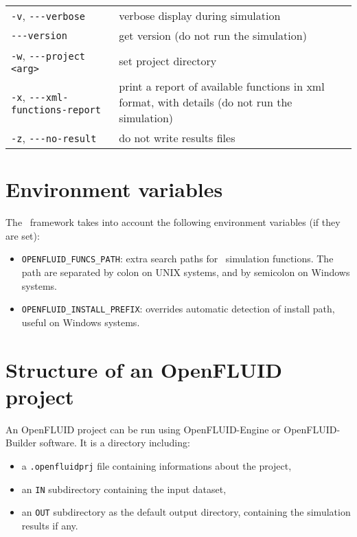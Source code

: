 \begin{center}
\begin{tabularx}{\linewidth}{lX}
\texttt{-v}, \verb?---?\texttt{verbose}&verbose display during simulation\\
\verb?---?\texttt{version}&get version (do not run the simulation)\\
\texttt{-w}, \verb?---?\texttt{project <arg>}&set project directory\\
\texttt{-x}, \verb?---?\texttt{xml-functions-report}&print a report of available functions in xml format, with details (do not run the simulation)\\
\texttt{-z}, \verb?---?\texttt{no-result}&do not write results files\\
\end{tabularx}
\end{center}


\medskip


\section{Environment variables}

The \OFname \ framework takes into account the following environment
variables (if they are set):
\begin{itemize}
\item \texttt{OPENFLUID\_FUNCS\_PATH}: extra search paths for \OFname \ simulation functions. The path are separated by colon on UNIX systems, and by semicolon on Windows systems. 
\item \texttt{OPENFLUID\_INSTALL\_PREFIX}: overrides automatic detection of install path, useful on Windows systems.
\end{itemize}

\medskip

\section{Structure of an OpenFLUID project}

An OpenFLUID project can be run using OpenFLUID-Engine or OpenFLUID-Builder software.
It is a directory including:
\begin{itemize}
  \item a \texttt{.openfluidprj} file containing informations about the project,  
  \item an \texttt{IN} subdirectory containing the input dataset,
  \item an \texttt{OUT} subdirectory as the default output directory, containing the simulation results if any. 
\end{itemize}

